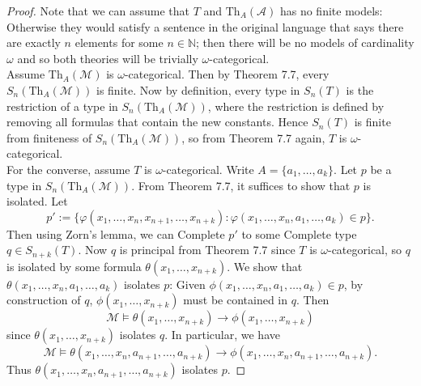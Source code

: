 \documentclass{article}
\begin{document}
\begin{enumerate}[label={\bf Q\arabic*:}]
    \begin{proof}
      Note that we can assume that $T$ and $\text{Th}_A(\mathcal{A})$ has
      no finite models: Otherwise they would satisfy a sentence in the
      original language that says there are exactly $n$ elements for some
      $n\in\mathbb{N}$; then there will be no models of cardinality
      $\omega$ and so both theories will be trivially $\omega$-categorical.
      \\

      Assume $\text{Th}_A(\mathcal{M})$ is $\omega$-categorical. Then by
      Theorem 7.7, every $S_n(\text{Th}_A(\mathcal{M}))$ is finite. Now
      by definition, every type in $S_n(T)$ is the restriction of a type in
      $S_n(\text{Th}_A(\mathcal{M}))$, where the restriction is defined by
      removing all formulas that contain the new constants. Hence $S_n(T)$
      is finite from finiteness of $S_n(\text{Th}_A(\mathcal{M}))$, so from
      Theorem 7.7 again, $T$ is $\omega$-categorical. \\

      For the converse, assume $T$ is $\omega$-categorical. Write
      $A=\{a_1,\ldots,a_k\}$. Let $p$ be a
      type in $S_n(\text{Th}_A(\mathcal{M}))$. From Theorem 7.7, it
      suffices to show that $p$ is isolated. Let
      \[p':=\{\varphi(x_1,\ldots,x_n,x_{n+1},\ldots,x_{n+k}):
      \varphi(x_1,\ldots,x_n,a_1,\ldots,a_k)\in p\}.\] Then using Zorn's
      lemma, we can Complete $p'$ to some Complete type $q\in S_{n+k}(T)$.
      Now $q$ is principal from Theorem 7.7 since $T$ is
      $\omega$-categorical, so $q$ is isolated by some formula
      $\theta(x_1,\ldots,x_{n+k})$. We show that
      $\theta(x_1,\ldots,x_n,a_1,\ldots,a_k)$ isolates $p$: Given
      $\phi(x_1,\ldots,x_n,a_1,\ldots,a_k)\in p$, by construction of $q$,
      $\phi(x_1,\ldots,x_{n+k})$ must be contained in $q$. Then
      \[\mathcal{M}\models
      \theta(x_1,\ldots,x_{n+k})\rightarrow\phi(x_1,\ldots,x_{n+k})\] since
      $\theta(x_1,\ldots,x_{n+k})$ isolates $q$. In particular, we have
      \[\mathcal{M}\models
      \theta(x_1,\ldots,x_n,a_{n+1},\ldots,a_{n+k})\rightarrow
      \phi(x_1,\ldots,x_n,a_{n+1},\ldots,a_{n+k}).\] Thus
      $\theta(x_1,\ldots,x_n,a_{n+1},\ldots,a_{n+k})$ isolates $p$.
    \end{proof}


\end{enumerate}
\end{document}
